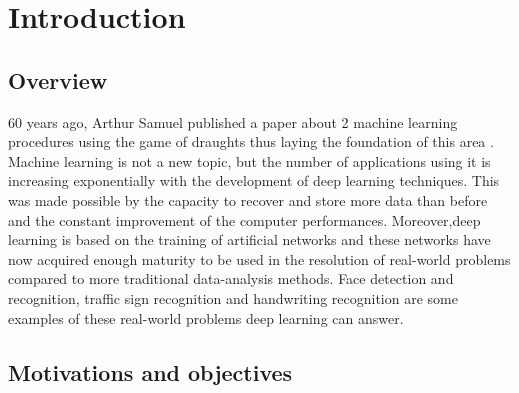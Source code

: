 
\chapter{Introduction} %

\label{Chapter1} %



\section{Overview}

60 years ago, Arthur Samuel published a paper about 2 machine learning procedures using the game of draughts thus laying the foundation of this area  \cite{Samuel}. Machine learning is not a new topic,  but the number of applications using it is increasing exponentially with the development of deep learning techniques. This was made possible by the capacity to recover and store more data than before and the constant improvement of the computer performances. Moreover,deep learning is based on the training of artificial networks and these networks have now acquired enough maturity to be used in the resolution of real-world problems compared to more traditional data-analysis methods. 
Face detection and recognition, traffic sign recognition and handwriting recognition are some examples of these real-world problems deep learning can answer. 





\section{Motivations and objectives}


